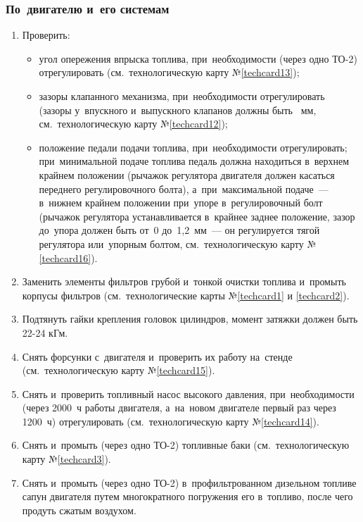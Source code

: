 \subsubsection{По~двигателю и~его системам}
\begin{enumerate}
    \item Проверить: 
        \begin{itemize}
            \item угол опережения впрыска топлива, при~необходимости (через одно ТО-2) отрегулировать (см.~технологическую карту №\ref{techcard13}); 
            \item зазоры клапанного механизма, при~необходимости отрегулировать (зазоры у~впускного и~выпускного клапанов должны быть ~мм, см.~технологическую карту №\ref{techcard12}); 
            \item положение педали подачи топлива, при~необходимости отрегулировать; при~минимальной подаче топлива педаль должна находиться в~верхнем крайнем положении (рычажок регулятора двигателя должен касаться переднего регулировочного болта), а~при~максимальной подаче~--- в~нижнем крайнем положении при~упоре в~регулировочный болт (рычажок регулятора устанавливается в~крайнее заднее положение, зазор до~упора должен быть от~0 до~1,2~мм~--- он регулируется тягой регулятора или~упорным болтом, см.~технологическую карту №\ref{techcard16}). 
        \end{itemize}
    \item Заменить элементы фильтров грубой и~тонкой очистки топлива и~промыть корпусы фильтров (см.~технологические карты №\ref{techcard1} и \ref{techcard2}). 
    \item Подтянуть гайки крепления головок цилиндров, момент затяжки должен быть 22-24 кГм. 
    \item Снять форсунки с~двигателя и~проверить их работу на~стенде (см.~технологическую карту №\ref{techcard15}). 
    \item Снять и~проверить топливный насос высокого давления, при~необходимости (через 2000~ч работы двигателя, а~на~новом двигателе первый раз через 1200~ч) отрегулировать (см.~технологическую карту №\ref{techcard14}). 
    \item Снять и~промыть (через одно ТО-2) топливные баки (см.~технологическую карту №\ref{techcard3}). 
    \item Снять и~промыть (через одно ТО-2) в~профильтрованном дизельном топливе сапун двигателя путем многократного погружения его в~топливо, после чего продуть сжатым воздухом. 
\end{enumerate}


